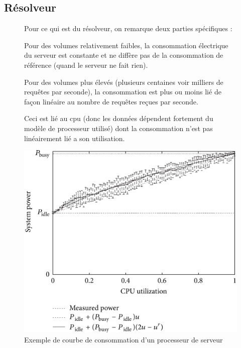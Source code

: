 \subsection{Résolveur}

\begin{figure}[ht]
  \noindent
  \begin{minipage}{.65\textwidth}
Pour ce qui est du résolveur, on remarque deux parties spécifiques :

Pour des volumes relativement faibles, la consommation électrique du serveur est constante et ne diffère pas de la consommation de référence (quand le serveur ne fait rien).

Pour des volumes plus élevés (plusieurs centaines voir milliers de requêtes par seconde), la consommation est plus ou moins lié de façon linéaire au nombre de requêtes reçues par seconde.

Ceci est lié au cpu (donc les données dépendent fortement du modèle de processeur utilisé) dont la consommation n'est pas linéairement lié a son utilisation. 
  \end{minipage}
  \hfill
  \begin{minipage}{.30\textwidth}
    \centering
      \includegraphics[width=\textwidth]{paper/figures/exempleCPUcurve.png}
      \caption{Exemple de courbe de consommation d'un processeur de serveur \cite{cpuGraph}}
      \label{fig:exempleCPUcurve}
  \end{minipage}
\end{figure}

